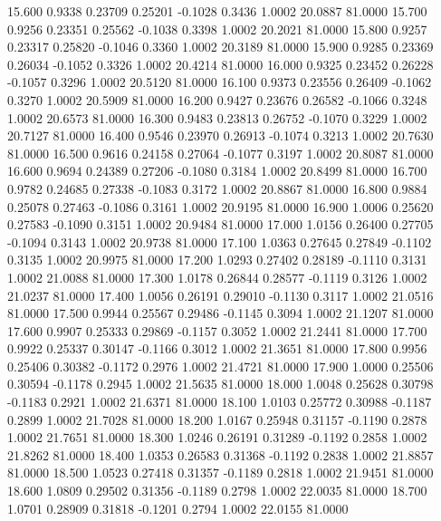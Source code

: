   15.600   0.9338   0.23709   0.25201  -0.1028   0.3436   1.0002  20.0887  81.0000
  15.700   0.9256   0.23351   0.25562  -0.1038   0.3398   1.0002  20.2021  81.0000
  15.800   0.9257   0.23317   0.25820  -0.1046   0.3360   1.0002  20.3189  81.0000
  15.900   0.9285   0.23369   0.26034  -0.1052   0.3326   1.0002  20.4214  81.0000
  16.000   0.9325   0.23452   0.26228  -0.1057   0.3296   1.0002  20.5120  81.0000
  16.100   0.9373   0.23556   0.26409  -0.1062   0.3270   1.0002  20.5909  81.0000
  16.200   0.9427   0.23676   0.26582  -0.1066   0.3248   1.0002  20.6573  81.0000
  16.300   0.9483   0.23813   0.26752  -0.1070   0.3229   1.0002  20.7127  81.0000
  16.400   0.9546   0.23970   0.26913  -0.1074   0.3213   1.0002  20.7630  81.0000
  16.500   0.9616   0.24158   0.27064  -0.1077   0.3197   1.0002  20.8087  81.0000
  16.600   0.9694   0.24389   0.27206  -0.1080   0.3184   1.0002  20.8499  81.0000
  16.700   0.9782   0.24685   0.27338  -0.1083   0.3172   1.0002  20.8867  81.0000
  16.800   0.9884   0.25078   0.27463  -0.1086   0.3161   1.0002  20.9195  81.0000
  16.900   1.0006   0.25620   0.27583  -0.1090   0.3151   1.0002  20.9484  81.0000
  17.000   1.0156   0.26400   0.27705  -0.1094   0.3143   1.0002  20.9738  81.0000
  17.100   1.0363   0.27645   0.27849  -0.1102   0.3135   1.0002  20.9975  81.0000
  17.200   1.0293   0.27402   0.28189  -0.1110   0.3131   1.0002  21.0088  81.0000
  17.300   1.0178   0.26844   0.28577  -0.1119   0.3126   1.0002  21.0237  81.0000
  17.400   1.0056   0.26191   0.29010  -0.1130   0.3117   1.0002  21.0516  81.0000
  17.500   0.9944   0.25567   0.29486  -0.1145   0.3094   1.0002  21.1207  81.0000
  17.600   0.9907   0.25333   0.29869  -0.1157   0.3052   1.0002  21.2441  81.0000
  17.700   0.9922   0.25337   0.30147  -0.1166   0.3012   1.0002  21.3651  81.0000
  17.800   0.9956   0.25406   0.30382  -0.1172   0.2976   1.0002  21.4721  81.0000
  17.900   1.0000   0.25506   0.30594  -0.1178   0.2945   1.0002  21.5635  81.0000
  18.000   1.0048   0.25628   0.30798  -0.1183   0.2921   1.0002  21.6371  81.0000
  18.100   1.0103   0.25772   0.30988  -0.1187   0.2899   1.0002  21.7028  81.0000
  18.200   1.0167   0.25948   0.31157  -0.1190   0.2878   1.0002  21.7651  81.0000
  18.300   1.0246   0.26191   0.31289  -0.1192   0.2858   1.0002  21.8262  81.0000
  18.400   1.0353   0.26583   0.31368  -0.1192   0.2838   1.0002  21.8857  81.0000
  18.500   1.0523   0.27418   0.31357  -0.1189   0.2818   1.0002  21.9451  81.0000
  18.600   1.0809   0.29502   0.31356  -0.1189   0.2798   1.0002  22.0035  81.0000
  18.700   1.0701   0.28909   0.31818  -0.1201   0.2794   1.0002  22.0155  81.0000
